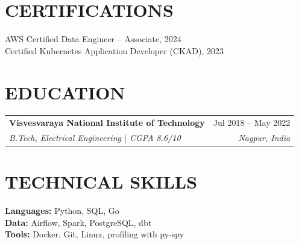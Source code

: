 \documentclass[letterpaper,10pt]{article}
\makeatletter
\newcommand{\entry}[4]{%
  \begin{tabularx}{\textwidth}{@{}X r@{}}
    \textbf{#1} & #2 \\
    \textit{#3} & \textit{#4} \\
  \end{tabularx}\vspace{-4pt}}
\makeatother
\begin{document}
\section*{CERTIFICATIONS}
AWS Certified Data Engineer -- Associate, 2024\\
Certified Kubernetes Application Developer (CKAD), 2023

\section*{EDUCATION}
\entry{Visvesvaraya National Institute of Technology}{Jul 2018 -- May 2022}{B.Tech, Electrical Engineering $|$ CGPA 8.6/10}{Nagpur, India}

\section*{TECHNICAL SKILLS}
\textbf{Languages:} Python, SQL, Go\\
\textbf{Data:} Airflow, Spark, PostgreSQL, dbt\\
\textbf{Tools:} Docker, Git, Linux, profiling with py-spy
\end{document}
